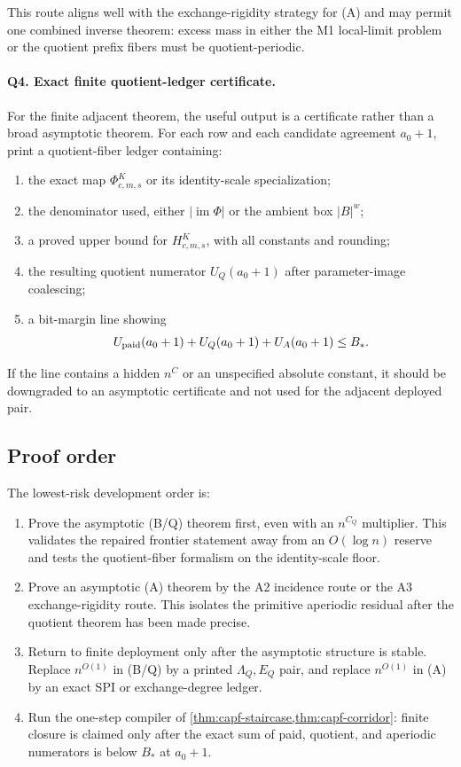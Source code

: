 \documentclass[11pt]{article}
\theoremstyle{definition}
\theoremstyle{remark}
\newcommand{\B}{B}
\begin{document}
This route aligns well with the exchange-rigidity strategy for \textup{(A)} and may permit one combined inverse theorem: excess mass in either the M1 local-limit problem or the quotient prefix fibers must be quotient-periodic.

\paragraph{Q4. Exact finite quotient-ledger certificate.}
For the finite adjacent theorem, the useful output is a certificate rather than a broad asymptotic theorem.  For each row and each candidate agreement $a_0+1$, print a quotient-fiber ledger containing:
\begin{enumerate}[label=\textup{Q4.\arabic*},leftmargin=3.0em]
\item the exact map $\Phi_{c,m,s}^{K}$ or its identity-scale specialization;
\item the denominator used, either $|\operatorname{im}\Phi|$ or the ambient box $|\B|^w$;
\item a proved upper bound for $H_{c,m,s}^{K}$, with all constants and rounding;
\item the resulting quotient numerator $U_Q(a_0+1)$ after parameter-image coalescing;
\item a bit-margin line showing
\[
        U_{\rm paid}(a_0+1)+U_Q(a_0+1)+U_A(a_0+1)\le B_* .
\]
\end{enumerate}
If the line contains a hidden $n^{C}$ or an unspecified absolute constant, it should be downgraded to an asymptotic certificate and not used for the adjacent deployed pair.

\subsection{Proof order}\label{subsec:capfaq-order}

The lowest-risk development order is:
\begin{enumerate}[label=\textup{(\arabic*)},leftmargin=2.5em]
\item Prove the asymptotic \textup{(B/Q)} theorem first, even with an $n^{C_Q}$ multiplier.  This validates the repaired frontier statement away from an $O(\log n)$ reserve and tests the quotient-fiber formalism on the identity-scale floor.
\item Prove an asymptotic \textup{(A)} theorem by the A2 incidence route or the A3 exchange-rigidity route.  This isolates the primitive aperiodic residual after the quotient theorem has been made precise.
\item Return to finite deployment only after the asymptotic structure is stable.  Replace $n^{O(1)}$ in \textup{(B/Q)} by a printed $\Lambda_Q,E_Q$ pair, and replace $n^{O(1)}$ in \textup{(A)} by an exact SPI or exchange-degree ledger.
\item Run the one-step compiler of \cref{thm:capf-staircase,thm:capf-corridor}: finite closure is claimed only after the exact sum of paid, quotient, and aperiodic numerators is below $B_*$ at $a_0+1$.
\end{enumerate}
\end{document}
